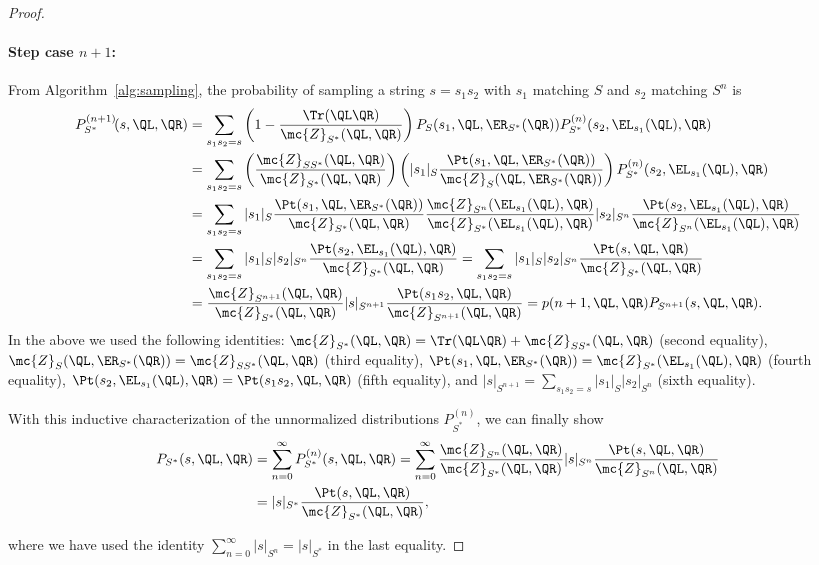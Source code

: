 \begin{proof}
\paragraph{\textbf{Step case} $n + 1$: } From Algorithm~\ref{alg:sampling}, 
the probability of sampling a string $s = s_1 s_2$ with $s_1$ matching $S$ and $s_2$ matching $S^{n}$ is
%
\begin{align*}
    P_{S^*}^{(n + 1)}\!(s, \QL, \QR) &= \sum_{s_1 s_2 = s} \left(1 - \frac{\Tr(\QL \QR)}{\mc{Z}_{S^*}(\QL, \QR)} \right) P_{S}(s_1, \QL, \ER_{S^*}(\QR)) P_{S^*}^{(n)}(s_2, \EL_{s_1}(\QL), \QR) \\ 
    &= \sum_{s_1 s_2 = s} \left(\frac{\mc{Z}_{SS^*}(\QL, \QR)}{\mc{Z}_{S^*}(\QL, \QR)} \right) \left(|s_1|_{S} \frac{\Pt(s_1, \QL, \ER_{S^*}(\QR))}{\mc{Z}_S(\QL, \ER_{S^*}(\QR))}\right) P_{S^*}^{(n)}(s_2, \EL_{s_1}(\QL), \QR) \\
    &= \sum_{s_1 s_2 = s} |s_1|_{S} \frac{\Pt(s_1, \QL, \ER_{S^*}(\QR))}{\mc{Z}_{S^*}(\QL, \QR)} \frac{\mc{Z}_{S^n}(\EL_{s_1}(\QL), \QR)}{\mc{Z}_{S^*}(\EL_{s_1}(\QL), \QR)} |s_2|_{S^n} \frac{\Pt(s_2, \EL_{s_1}(\QL), \QR)}{\mc{Z}_{S^n}(\EL_{s_1}(\QL), \QR)} \\
    &= \sum_{s_1 s_2 = s} |s_1|_{S} |s_2|_{S^n} \frac{\Pt(s_2, \EL_{s_1}(\QL), \QR)}{\mc{Z}_{S^*}(\QL, \QR)} = \sum_{s_1 s_2 = s} |s_1|_{S} |s_2|_{S^n} \frac{\Pt(s, \QL, \QR)}{\mc{Z}_{S^*}(\QL, \QR)} \\
    &= \frac{\mc{Z}_{S^{n+1}}(\QL, \QR)}{\mc{Z}_{S^*}(\QL, \QR)} |s|_{S^{n+1}} \frac{\Pt(s_1 s_2, \QL, \QR)}{\mc{Z}_{S^{n+1}}(\QL, \QR)} = p(n+1, \QL, \QR) P_{S^{n+1}}(s, \QL, \QR). \\
\end{align*}
%
In the above we used the following identities: $\mc{Z}_{S^*}(\QL, \QR) = \Tr(\QL \QR) + \mc{Z}_{SS^*}(\QL, \QR)$ (second equality), $\mc{Z}_S(\QL, \ER_{S^*}(\QR)) = \mc{Z}_{SS^*}(\QL, \QR)$ (third equality), $\Pt(s_1, \QL, \ER_{S^*}(\QR)) = \mc{Z}_{S^*}(\EL_{s_1}(\QL), \QR)$ (fourth equality), $\Pt(s_2, \EL_{s_1}(\QL), \QR) = \Pt(s_1 s_2, \QL, \QR)$ (fifth equality), and $|s|_{S^{n+1}} = \sum_{s_1 s_2 = s} |s_1|_{S} |s_2|_{S^n}$ (sixth equality).

With this inductive characterization of the unnormalized distributions $P_{S^*}^{(n)}$, we can finally show
%
\begin{align*}
    P_{S^*}(s, \QL, \QR) &= \sum_{n = 0}^\infty P_{S^*}^{(n)}(s, \QL, \QR) = \sum_{n = 0}^\infty \frac{\mc{Z}_{S^{n}}(\QL, \QR)}{\mc{Z}_{S^*}(\QL, \QR)} |s|_{S^{n}} \frac{\Pt(s, \QL, \QR)}{\mc{Z}_{S^{n}}(\QL, \QR)} \\
    &= |s|_{S^*} \frac{\Pt(s, \QL, \QR)}{\mc{Z}_{S^*}(\QL, \QR)},
\end{align*}

where we have used the identity $\sum_{n = 0}^\infty |s|_{S^{n}} = |s|_{S^*}$ in the last equality.

\end{proof}

